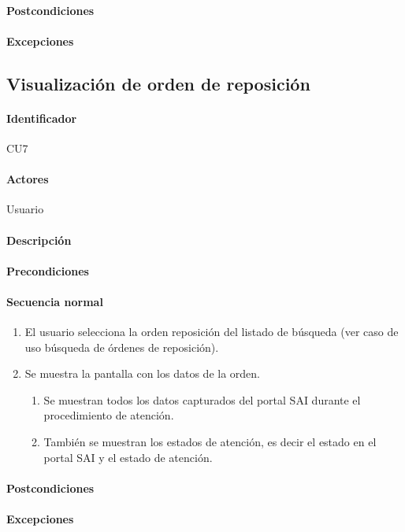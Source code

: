 \paragraph{Postcondiciones}
\paragraph{Excepciones}


\subsection{Visualización de orden de reposición}
\paragraph{Identificador}
CU7
\paragraph{Actores}
Usuario
\paragraph{Descripción}
\paragraph{Precondiciones}
\paragraph{Secuencia normal}
\begin{enumerate}
  \item El usuario selecciona la orden reposición del listado de búsqueda (ver caso de uso búsqueda de órdenes de reposición).
  \item Se muestra la pantalla con los datos de la orden.
  \begin{enumerate}
    \item Se muestran todos los datos capturados del portal SAI durante el procedimiento de atención.
    \item También se muestran los estados de atención, es decir el estado en el portal SAI  y el estado de atención.
  \end{enumerate}
\end{enumerate}
\paragraph{Postcondiciones}
\paragraph{Excepciones}


